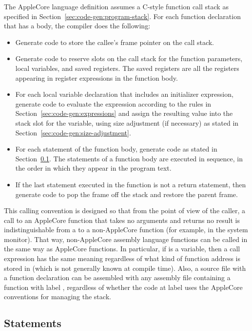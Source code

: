 \documentclass[10pt]{article}
\begin{document}
The AppleCore language definition assumes a C-style function call
stack as specified in Section~\ref{sec:code-gen:program-stack}.  For
each function declaration that has a body, the compiler does the
following:
%
\begin{itemize}
%
\item Generate code to store the callee's frame pointer on the call
  stack.
%
\item Generate code to reserve slots on the call stack for the
  function parameters, local variables, and saved registers.  The
  saved registers are all the registers appearing in register
  expressions in the function body.
%
\item For each local variable declaration that includes an initializer
  expression, generate code to evaluate the expression according to
  the rules in Section~\ref{sec:code-gen:expressions} and assign the
  resulting value into the stack slot for the variable, using size
  adjustment (if necessary) as stated in
  Section~\ref{sec:code-gen:size-adjustment}.
%
\item For each statement of the function body, generate code as stated
  in Section~\ref{sec:code-gen:statements}.  The statements of a
  function body are executed in sequence, in the order in which they
  appear in the program text.
%
\item If the last statement executed in the function is not a return
  statement, then generate code to pop the frame off the stack and
  restore the parent frame.
%
\end{itemize}
%
This calling convention is designed so that from the point of view of
the caller, a call to an AppleCore function that takes no arguments
and returns no result is indistinguishable from a  to a
non-AppleCore function (for example, in the system monitor).  That
way, non-AppleCore assembly language functions can be called in the
same way as AppleCore functions.  In particular, if  is a
variable, then a call expression  has the same meaning
regardless of what kind of function address is stored in 
(which is not generally known at compile time).  Also, a source file
with a function declaration  can be assembled with any
assembly file containing a function with label , regardless
of whether the code at label  uses the AppleCore conventions
for managing the stack.

\subsection{Statements}
\label{sec:code-gen:statements}
\end{document}
